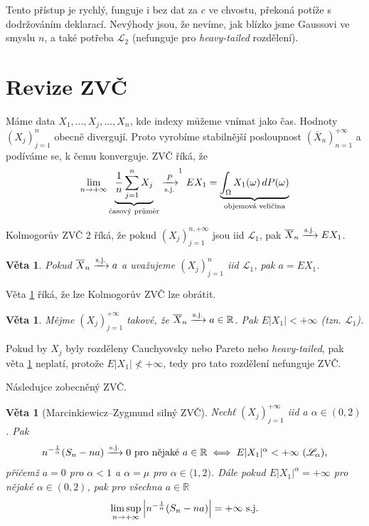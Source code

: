 \documentclass{article}
\newtheorem{theorem}[subsubsection]{Věta}
\theoremstyle{remark}
\theoremstyle{plain}
\theoremstyle{definition}
\theoremstyle{remark}
\begin{document}
Tento přístup je rychlý, funguje i bez dat za $c$ ve chvostu, překoná potíže s dodržováním deklarací. Nevýhody jsou, že nevíme, jak blízko jsme Gaussovi ve smyslu $n$, a také potřeba $\mathscr{L}_2$ (nefunguje pro \textit{heavy-tailed} rozdělení).

\section{Revize ZVČ}

Máme data $X_1,\dots,X_j,\dots,X_n$, kde indexy můžeme vnímat jako čas. Hodnoty $(X_j)_{j=1}^n$ obecně divergují. Proto vyrobíme stabilnější posloupnost $(\overline{X}_n)_{n=1}^{+\infty}$ a podíváme se, k čemu konverguje. ZVČ říká, že
\begin{align*}
    \lim_{n\rightarrow +\infty} \underbrace{\frac{1}{n}\sum_{j=1}^nX_j}_{\textnormal{časový průměr}}\xrightarrow[\textnormal{s.j.}]{P}^{\footnotemark{}}EX_1=\underbrace{\int_\Omega X_1(\omega)\,dP(\omega)}_{\textnormal{objemová veličina}}
\end{align*}

Kolmogorův ZVČ 2 říká, že pokud $(X_j)_{j=1}^{n,+\infty}$ jsou iid $\mathscr{L}_1$, pak $\overline{X}_n\xrightarrow{\textnormal{s.j.}}EX_1$.

\begin{theorem}
Pokud $\overline{X}_n\xrightarrow{\textnormal{s.j.}}a$ a uvažujeme $(X_j)_{j=1}^{n}$ iid $\mathscr{L}_1$, pak $a=EX_1$.
\label{obraceny_zvc}
\end{theorem}

Věta \ref{obraceny_zvc} říká, že lze Kolmogorův ZVČ lze obrátit.

\begin{theorem}
Mějme $(X_j)_{j=1}^{+\infty}$ takové, že $\overline{X}_n\xrightarrow{\textnormal{s.j.}}a\in\mathbb{R}$. Pak $E|X_1|<+\infty$ (tzn. $\mathscr{L}_1$).
\label{spec_zvc}
\end{theorem}

Pokud by $X_j$ byly rozděleny Cauchyovsky nebo Pareto nebo \textit{heavy-tailed}, pak věta \ref{spec_zvc} neplatí, protože $E|X_1|\nless +\infty$, tedy pro tato rozdělení nefunguje ZVČ.

Následujce zobecněný ZVČ.

\begin{theorem}[Marcinkiewicz–Zygmund silný ZVČ]
Nechť $(X_j)_{j=1}^{+\infty}$ iid a $\alpha\in(0,2)$. Pak
\begin{align*}
    n^{-\frac{1}{\alpha}}(S_n-na)\xrightarrow{\textnormal{s.j.}} 0 \textnormal{ pro nějaké } a\in\mathbb{R} \iff E|X_1|^\alpha<+\infty\,\,(\mathscr{L}_\alpha),
\end{align*}
přičemž $a=0$ pro $\alpha<1$ a $\alpha=\mu$ pro $\alpha\in\langle 1,2)$.
Dále pokud $E|X_1|^\alpha=+\infty$ pro nějaké $\alpha\in(0,2)$, pak pro všechna $a\in\mathbb{R}$
\begin{align*}
    \limsup_{n\rightarrow+\infty}\left|n^{-\frac{1}{\alpha}}(S_n-na)\right|=+\infty\,\,\textnormal{s.j.}
\end{align*}
\end{theorem}
\end{document}

